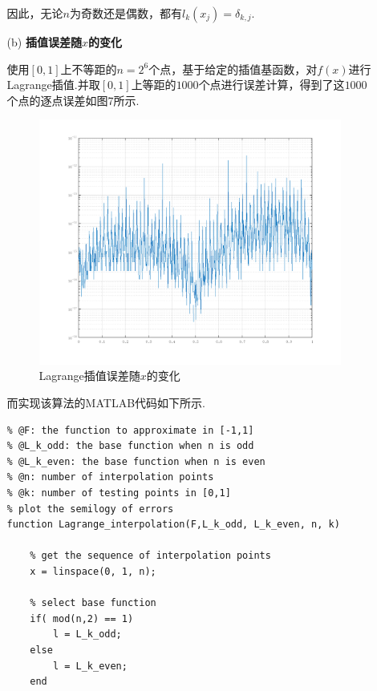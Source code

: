 \documentclass[12pt,a4paper,utf8]{ctexart}
\begin{document}
\begin{enumerate}
\begin{itemize}
      \par
      因此，无论$n$为奇数还是偶数，都有$l_k(x_j) = \delta_{k,j}$.

      \item [(b)] \textbf{插值误差随$x$的变化} 
      \par
      使用$[0,1]$上不等距的$n = 2^6$个点，基于给定的插值基函数，对$f(x)$进行Lagrange插值.并取$[0,1]$上等距的$1000$个点进行误差计算，得到了这$1000$个点的逐点误差如图7所示.
      \begin{figure}[htbp]
        \centering
        \includegraphics[scale=0.7]{pictures/p3.png}
        \caption{\small{Lagrange插值误差随$x$的变化}} %
      \end{figure}

      \par
      而实现该算法的MATLAB代码如下所示.
    \begin{lstlisting}[frame=single]
% use Lagrange interpolation to approximate a function
% @F: the function to approximate in [-1,1]
% @L_k_odd: the base function when n is odd
% @L_k_even: the base function when n is even
% @n: number of interpolation points
% @k: number of testing points in [0,1]
% plot the semilogy of errors
function Lagrange_interpolation(F,L_k_odd, L_k_even, n, k)

    % get the sequence of interpolation points
    x = linspace(0, 1, n);
    
    % select base function
    if( mod(n,2) == 1)
        l = L_k_odd;
    else
        l = L_k_even;
    end
    

\end{lstlisting}
\end{itemize}
\end{enumerate}
\end{document}
